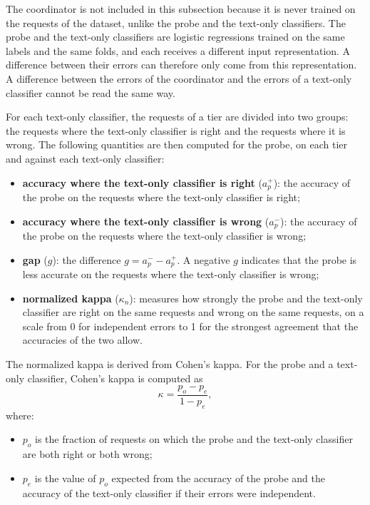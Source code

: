 The coordinator is not included in this subsection because it is never trained on the requests of the dataset, unlike the probe and the text-only classifiers. The probe and the text-only classifiers are logistic regressions trained on the same labels and the same folds, and each receives a different input representation. A difference between their errors can therefore only come from this representation. A difference between the errors of the coordinator and the errors of a text-only classifier cannot be read the same way.

For each text-only classifier, the requests of a tier are divided into two groups: the requests where the text-only classifier is right and the requests where it is wrong. The following quantities are then computed for the probe, on each tier and against each text-only classifier:

\begin{itemize}
    \item \textbf{accuracy where the text-only classifier is right} ($a_p^{+}$): the accuracy of the probe on the requests where the text-only classifier is right;
    \item \textbf{accuracy where the text-only classifier is wrong} ($a_p^{-}$): the accuracy of the probe on the requests where the text-only classifier is wrong;
    \item \textbf{gap} ($g$): the difference $g = a_p^{-} - a_p^{+}$. A negative $g$ indicates that the probe is less accurate on the requests where the text-only classifier is wrong;
    \item \textbf{normalized kappa} ($\kappa_n$): measures how strongly the probe and the text-only classifier are right on the same requests and wrong on the same requests, on a scale from 0 for independent errors to 1 for the strongest agreement that the accuracies of the two allow.
\end{itemize}

The normalized kappa is derived from Cohen's kappa. For the probe and a text-only classifier, Cohen's kappa is computed as
\[
    \kappa = \frac{p_o - p_e}{1 - p_e},
\]
where:

\begin{itemize}
    \item $p_o$ is the fraction of requests on which the probe and the text-only classifier are both right or both wrong;
    \item $p_e$ is the value of $p_o$ expected from the accuracy of the probe and the accuracy of the text-only classifier if their errors were independent.
\end{itemize}

